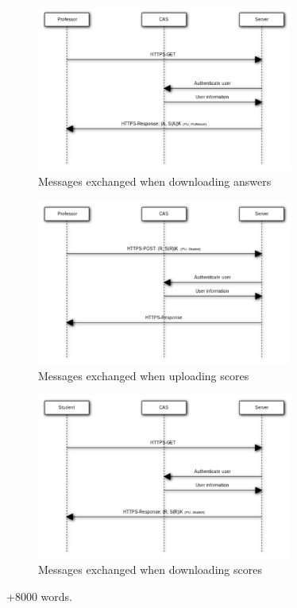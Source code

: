 \documentclass{article}
\begin{document}
\begin{figure}
\begin{center}
\includegraphics[width=0.75\textwidth]{images/download_answers.pdf}
\caption{Messages exchanged when downloading answers}
\label{fig:download-answers}
\end{center}
\end{figure}

\begin{figure}
\begin{center}
\includegraphics[width=0.75\textwidth]{images/upload_scores.pdf}
\caption{Messages exchanged when uploading scores}
\label{fig:upload-scores}
\end{center}
\end{figure}

\begin{figure}
\begin{center}
\includegraphics[width=0.75\textwidth]{images/download_scores.pdf}
\caption{Messages exchanged when downloading scores}
\label{fig:download-scores}
\end{center}
\end{figure}

+8000 words.
\end{document}
